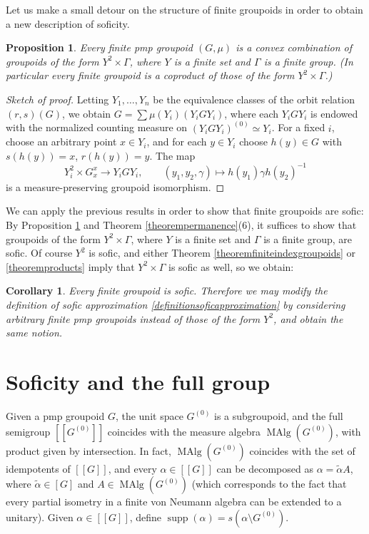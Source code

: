 \documentclass[11pt]{amsart}
\theoremstyle{plain}    \newtheorem{theorem}[generalnumbering]{Theorem}
\theoremstyle{plain}    \newtheorem{corollary}[generalnumbering]{Corollary}
\theoremstyle{definition}   \newtheorem{definition}[generalnumbering]{Definition}
\theoremstyle{definition}   \newtheorem{example}[generalnumbering]{Example}
\theoremstyle{plain}    \newtheorem{proposition}[generalnumbering]{Proposition}
\theoremstyle{plain}    \newtheorem{lemma}[generalnumbering]{Lemma}
\theoremstyle{plain}    \newtheorem{plainstyle}[generalnumbering]{\namefordifferentenvironment}
\theoremstyle{plain}    \newtheorem*{plainstyle*}{\namefordifferentenvironment}
\theoremstyle{definition}    \newtheorem{definitionstyle}[generalnumbering]{\namefordifferentenvironment}
\theoremstyle{definition}    \newtheorem*{definitionstyle*}{\namefordifferentenvironment}
\begin{document}
Let us make a small detour on the structure of finite groupoids in order to obtain a new description of soficity.

\begin{proposition}\label{propositionfinitegroupoids}
Every finite pmp groupoid $(G,\mu)$ is a convex combination of groupoids of the form $Y^2\times\Gamma$, where $Y$ is a finite set and $\Gamma$ is a finite group. (In particular every finite groupoid is a coproduct of those of the form $Y^2\times\Gamma$.)
\end{proposition}
\begin{proof}[Sketch of proof]
Letting $Y_1,\ldots,Y_n$ be the equivalence classes of the orbit relation $(r,s)(G)$, we obtain $G=\sum\mu(Y_i)(Y_iGY_i)$, where each $Y_iGY_i$ is endowed with the normalized counting measure on $(Y_iGY_i)^{(0)}\simeq Y_i$. For a fixed $i$, choose an arbitrary point $x\in Y_i$, and for each $y\in Y_i$ choose $h(y)\in G$ with $s(h(y))=x$, $r(h(y))=y$. The map
\[Y_i^2\times G_x^x\to Y_iGY_i,\qquad (y_1,y_2,\gamma)\mapsto h(y_1)\gamma h(y_2)^{-1}\]
is a measure-preserving groupoid isomorphism.\qedhere
\end{proof}

We can apply the previous results in order to show that finite groupoids are sofic: By Proposition \ref{propositionfinitegroupoids} and Theorem \ref{theorempermanence}(6), it suffices to show that groupoids of the form $Y^2\times\Gamma$, where $Y$ is a finite set and $\Gamma$ is a finite group, are sofic. Of course $Y^2$ is sofic, and either Theorem \ref{theoremfiniteindexgroupoids} or \ref{theoremproducts} imply that $Y^2\times\Gamma$ is sofic as well, so we obtain:

\begin{corollary}
Every finite groupoid is sofic. Therefore we may modify the definition of sofic approximation \ref{definitionsoficapproximation} by considering arbitrary finite pmp groupoids instead of those of the form $Y^2$, and obtain the same notion.
\end{corollary}

\section{Soficity and the full group}

Given a pmp groupoid $G$, the unit space $G^{(0)}$ is a subgroupoid, and the full semigroup $[[G^{(0)}]]$ coincides with the measure algebra $\operatorname{MAlg}(G^{(0)})$, with product given by intersection. In fact, $\operatorname{MAlg}(G^{(0)})$ coincides with the set of idempotents of $[[G]]$, and every $\alpha\in[[G]]$ can be decomposed as $\alpha=\widetilde{\alpha}A$, where $\widetilde{\alpha}\in[G]$ and $A\in\operatorname{MAlg}(G^{(0)})$ (which corresponds to the fact that every partial isometry in a finite von Neumann algebra can be extended to a unitary). Given $\alpha\in[[G]]$, define $\operatorname{supp}(\alpha)=s(\alpha\setminus G^{(0)})$.
\end{document}
